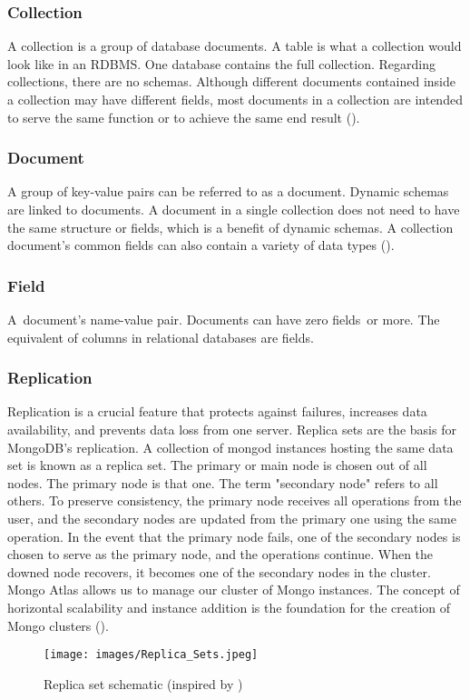 \subsubsection{Collection}
A collection is a group of database documents. A table is what a collection would look like in an RDBMS. One database contains the full collection. Regarding collections, there are no schemas. Although different documents contained inside a collection may have different fields, most documents in a collection are intended to serve the same function or to achieve the same end result (\cite{intellipaat_2016}).

\subsubsection{Document}
A group of key-value pairs can be referred to as a document. Dynamic schemas are linked to documents. A document in a single collection does not need to have the same structure or fields, which is a benefit of dynamic schemas. A collection document's common fields can also contain a variety of data types (\cite{intellipaat_2016}).

\subsubsection{Field}
A document's name-value pair. Documents can have zero fields or more. The equivalent of columns in relational databases are fields. 

\subsubsection{Replication}
Replication is a crucial feature that protects against failures, increases data availability, and prevents data loss from one server.
Replica sets are the basis for MongoDB's replication. A collection of mongod instances hosting the same data set is known as a replica set. The primary or main node is chosen out of all nodes. The primary node is that one. The term "secondary node" refers to all others. To preserve consistency, the primary node receives all operations from the user, and the secondary nodes are updated from the primary one using the same operation. In the event that the primary node fails, one of the secondary nodes is chosen to serve as the primary node, and the operations continue. When the downed node recovers, it becomes one of the secondary nodes in the cluster. Mongo Atlas allows us to manage our cluster of Mongo instances. The concept of horizontal scalability and instance addition is the foundation for the creation of Mongo clusters (\cite{roy_databases_2020}). 
\begin{figure}[H]
    \centering
    \texttt{[image: images/Replica\_Sets.jpeg]}
        \caption{Replica set schematic (inspired by \cite{roy_databases_2020})}
    \label{fig:Replica Sets}
\end{figure}

